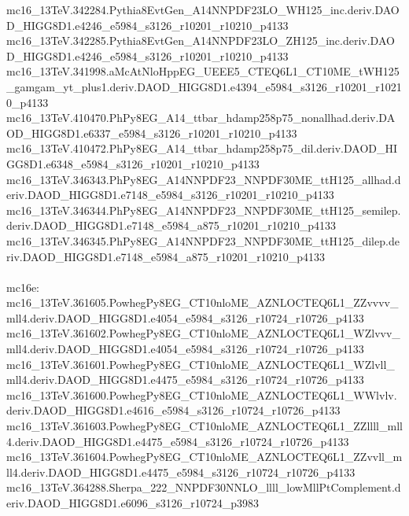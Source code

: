 \begin{scriptsize}
mc16\_13TeV.342284.Pythia8EvtGen\_A14NNPDF23LO\_WH125\_inc.deriv.DAOD\_HIGG8D1.e4246\_e5984\_s3126\_r10201\_r10210\_p4133 \\
mc16\_13TeV.342285.Pythia8EvtGen\_A14NNPDF23LO\_ZH125\_inc.deriv.DAOD\_HIGG8D1.e4246\_e5984\_s3126\_r10201\_r10210\_p4133 \\
mc16\_13TeV.341998.aMcAtNloHppEG\_UEEE5\_CTEQ6L1\_CT10ME\_tWH125\_gamgam\_yt\_plus1.deriv.DAOD\_HIGG8D1.e4394\_e5984\_s3126\_r10201\_r10210\_p4133 \\
mc16\_13TeV.410470.PhPy8EG\_A14\_ttbar\_hdamp258p75\_nonallhad.deriv.DAOD\_HIGG8D1.e6337\_e5984\_s3126\_r10201\_r10210\_p4133 \\
mc16\_13TeV.410472.PhPy8EG\_A14\_ttbar\_hdamp258p75\_dil.deriv.DAOD\_HIGG8D1.e6348\_e5984\_s3126\_r10201\_r10210\_p4133 \\
mc16\_13TeV.346343.PhPy8EG\_A14NNPDF23\_NNPDF30ME\_ttH125\_allhad.deriv.DAOD\_HIGG8D1.e7148\_e5984\_s3126\_r10201\_r10210\_p4133 \\
mc16\_13TeV.346344.PhPy8EG\_A14NNPDF23\_NNPDF30ME\_ttH125\_semilep.deriv.DAOD\_HIGG8D1.e7148\_e5984\_a875\_r10201\_r10210\_p4133 \\
mc16\_13TeV.346345.PhPy8EG\_A14NNPDF23\_NNPDF30ME\_ttH125\_dilep.deriv.DAOD\_HIGG8D1.e7148\_e5984\_a875\_r10201\_r10210\_p4133 \\
 \\
mc16e: \\
mc16\_13TeV.361605.PowhegPy8EG\_CT10nloME\_AZNLOCTEQ6L1\_ZZvvvv\_mll4.deriv.DAOD\_HIGG8D1.e4054\_e5984\_s3126\_r10724\_r10726\_p4133 \\
mc16\_13TeV.361602.PowhegPy8EG\_CT10nloME\_AZNLOCTEQ6L1\_WZlvvv\_mll4.deriv.DAOD\_HIGG8D1.e4054\_e5984\_s3126\_r10724\_r10726\_p4133 \\
mc16\_13TeV.361601.PowhegPy8EG\_CT10nloME\_AZNLOCTEQ6L1\_WZlvll\_mll4.deriv.DAOD\_HIGG8D1.e4475\_e5984\_s3126\_r10724\_r10726\_p4133 \\
mc16\_13TeV.361600.PowhegPy8EG\_CT10nloME\_AZNLOCTEQ6L1\_WWlvlv.deriv.DAOD\_HIGG8D1.e4616\_e5984\_s3126\_r10724\_r10726\_p4133 \\
mc16\_13TeV.361603.PowhegPy8EG\_CT10nloME\_AZNLOCTEQ6L1\_ZZllll\_mll4.deriv.DAOD\_HIGG8D1.e4475\_e5984\_s3126\_r10724\_r10726\_p4133 \\
mc16\_13TeV.361604.PowhegPy8EG\_CT10nloME\_AZNLOCTEQ6L1\_ZZvvll\_mll4.deriv.DAOD\_HIGG8D1.e4475\_e5984\_s3126\_r10724\_r10726\_p4133 \\
mc16\_13TeV.364288.Sherpa\_222\_NNPDF30NNLO\_llll\_lowMllPtComplement.deriv.DAOD\_HIGG8D1.e6096\_s3126\_r10724\_p3983

\end{scriptsize}
